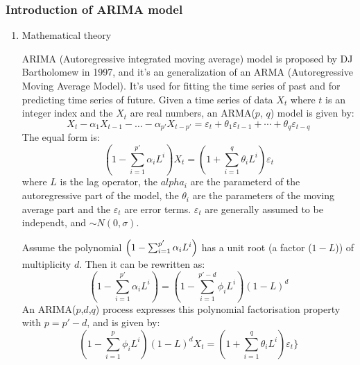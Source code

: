 \subsubsection{Introduction of ARIMA model}
\begin{enumerate}
    \item{Mathematical theory}\par
        ARIMA (Autoregressive integrated moving average) model is proposed by DJ Bartholomew in 1997, and it's an generalization of an ARMA (Autoregressive Moving Average Model). \cite{bartholomew1971time} It's used for fitting the time series of past and for predicting time series of future. Given a time series of data $X_t$ where $t$ is an integer index and the $X_t$ are real numbers, an ARMA($p$, $q$) model is given by:
    \begin{equation}
        {\displaystyle X_{t}-\alpha _{1}X_{t-1}-\dots -\alpha _{p'}X_{t-p'}=\varepsilon _{t}+\theta _{1}\varepsilon _{t-1}+\cdots +\theta _{q}\varepsilon _{t-q}}
    \end{equation}
    The equal form is:
    \begin{equation}
        \left(1-\sum _{i=1}^{p'}\alpha _{i}L^{i}\right)X_{t}=\left(1+\sum _{i=1}^{q}\theta _{i}L^{i}\right)\varepsilon _{t}
    \end{equation}
    where $L$ is the lag operator, the $alpha_i$ are the parameterd of the autoregressive part of the model, the $\theta_i$ are the parameters of the moving average part and the $\varepsilon_t$ are error terms. $\varepsilon_t$ are generally assumed to be independt, and $\sim N(0,\sigma)$.
    
    Assume the polynomial ${\displaystyle \textstyle \left(1-\sum _{i=1}^{p'}\alpha _{i}L^{i}\right)}$ has a unit root (a factor ($1-L$)) of multiplicity $d$. Then it can be rewritten as:
    \begin{equation}
    {\displaystyle \left(1-\sum _{i=1}^{p'}\alpha _{i}L^{i}\right)=\left(1-\sum _{i=1}^{p'-d}\phi _{i}L^{i}\right)\left(1-L\right)^{d}}
    \end{equation}
    An ARIMA($p$,$d$,$q$) process expresses this polynomial factorisation property with $p=p'-d$, and is given by:
    \begin{equation}
    {\displaystyle \left(1-\sum _{i=1}^{p}\phi _{i}L^{i}\right)(1-L)^{d}X_{t}=\left(1+\sum _{i=1}^{q}\theta _{i}L^{i}\right)\varepsilon _{t}\}}
    \end{equation}
    

\end{enumerate}
